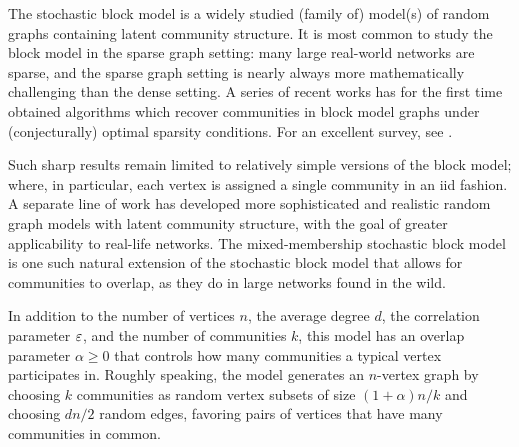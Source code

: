 The stochastic block model is a widely studied (family of) model(s) of random graphs containing latent community structure.
It is most common to study the block model in the sparse graph setting: many large real-world networks are sparse, and the sparse graph setting is nearly always more mathematically challenging than the dense setting.
A series of recent works has for the first time obtained algorithms which recover communities in block model graphs under (conjecturally) optimal sparsity conditions.
For an excellent survey, see \cite{DBLP:journals/corr/Abbe17}.

Such sharp results remain limited to relatively simple versions of the block model; where, in particular, each vertex is assigned a single community in an iid fashion.
A separate line of work has developed more sophisticated and realistic random graph models with latent community structure, with the goal of greater applicability to real-life networks.
The mixed-membership stochastic block model \cite{DBLP:conf/nips/AiroldiBFX08} is one such natural extension of the stochastic block model that allows for communities to overlap, as they do in large networks found in the wild.

In addition to the number of vertices $n$, the average degree $d$, the correlation parameter $\varepsilon$, and the number of communities $k$, this model has an overlap parameter $\alpha\ge 0$ that controls how many communities a typical vertex participates in.
Roughly speaking, the model generates an $n$-vertex graph by choosing $k$ communities as random vertex subsets of size $(1+\alpha)n/k$ and choosing $d n /2$ random edges, favoring pairs of vertices that have many communities in common.

